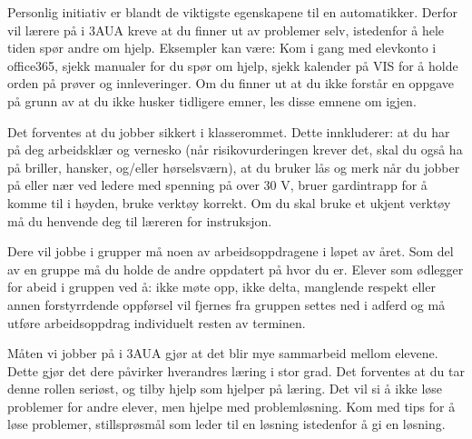 \vskip 10pt



\noindent
{} Personlig initiativ er blandt de viktigste egenskapene til en automatikker. Derfor vil lærere på i 3AUA kreve at du finner ut av problemer selv, istedenfor å hele tiden spør andre om hjelp. Eksempler kan være: Kom i gang med elevkonto i office365, sjekk manualer for du spør om hjelp, sjekk kalender på VIS for å holde orden på prøver og innleveringer. Om du finner ut at du ikke forstår en oppgave på grunn av at du ikke husker tidligere emner, les disse emnene om igjen. 
\vskip 10pt

\noindent
{} Det forventes at du jobber sikkert i klasserommet. Dette innkluderer: at du har på deg arbeidsklær og vernesko (når risikovurderingen krever det,  skal du også ha på briller, hansker, og/eller hørselsværn), at du bruker lås og merk når du jobber på eller nær ved ledere med spenning på over 30 V, bruer gardintrapp for å komme til i høyden, bruke verktøy korrekt. Om du skal bruke et ukjent verktøy må du henvende deg til læreren for instruksjon. 
\vskip 10pt

\noindent
{} Dere vil jobbe i grupper må noen av arbeidsoppdragene i løpet av året. Som del av en gruppe må du holde de andre oppdatert på hvor du er. Elever som ødlegger for abeid i gruppen  ved å: ikke møte opp, ikke delta, manglende respekt eller annen forstyrrdende oppførsel vil fjernes fra gruppen settes ned i adferd og må utføre arbeidsoppdrag individuelt resten av terminen. 
\vskip 10pt

\noindent
{} Måten vi jobber på i 3AUA gjør at det blir mye sammarbeid mellom elevene. Dette gjør det dere påvirker hverandres læring i stor grad. Det forventes at du tar denne rollen seriøst, og tilby hjelp som hjelper på læring. Det vil si å ikke løse problemer for andre elever, men hjelpe med problemløsning. Kom med tips for å løse problemer, stillsprøsmål som leder til en løsning istedenfor å gi en løsning. 
\vskip 10pt


